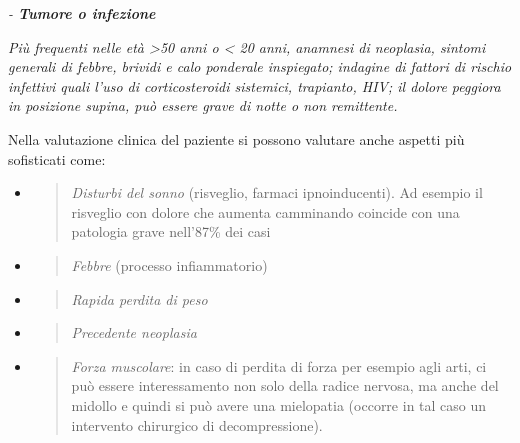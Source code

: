\documentclass[]{article}
\begin{document}
\emph{- \textbf{Tumore o infezione }}

\emph{Più frequenti nelle età \textgreater{}50 anni o \textless{} 20
anni, anamnesi di neoplasia, sintomi generali di febbre, brividi e calo
ponderale inspiegato; indagine di fattori di rischio infettivi quali
l'uso di corticosteroidi sistemici, trapianto, HIV; il dolore peggiora
in posizione supina, può essere grave di notte o non remittente. }

Nella valutazione clinica del paziente si possono valutare anche aspetti
più sofisticati come:

\begin{itemize}
\item
  \begin{quote}
  \emph{\emph{Disturbi del sonno}} (risveglio, farmaci ipnoinducenti).
  Ad esempio il risveglio con dolore che aumenta camminando coincide con
  una patologia grave nell'87\% dei casi
  \end{quote}
\end{itemize}

\begin{itemize}
\item
  \begin{quote}
  \emph{\emph{Febbre}} (processo infiammatorio)
  \end{quote}
\end{itemize}

\begin{itemize}
\item
  \begin{quote}
  \emph{\emph{Rapida perdita di peso}}
  \end{quote}
\end{itemize}

\begin{itemize}
\item
  \begin{quote}
  \emph{\emph{Precedente neoplasia}}
  \end{quote}
\end{itemize}

\begin{itemize}
\item
  \begin{quote}
  \emph{\emph{Forza muscolare}}: in caso di perdita di forza per esempio
  agli arti, ci può essere interessamento non solo della radice nervosa,
  ma anche del midollo e quindi si può avere una mielopatia (occorre in
  tal caso un intervento chirurgico di decompressione).
  \end{quote}
\end{itemize}
\end{document}

